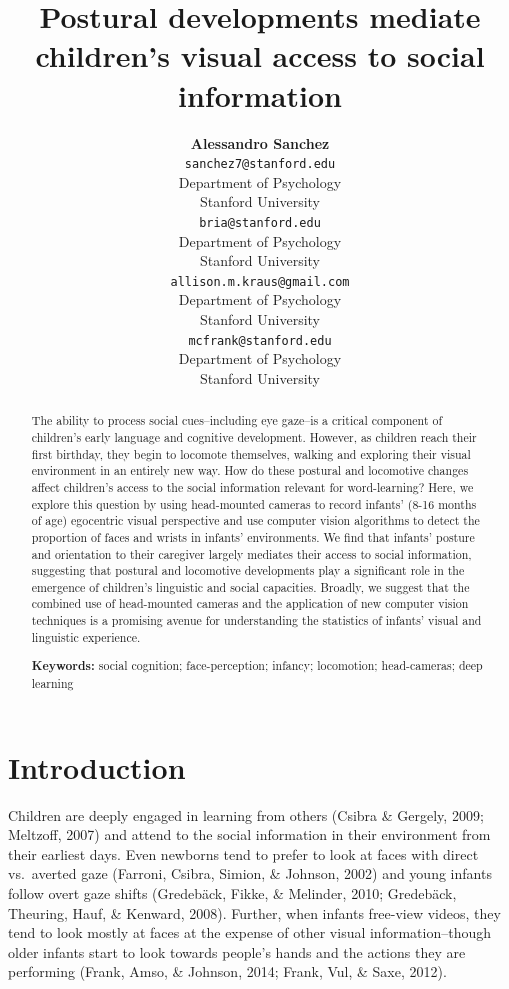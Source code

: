 \documentclass[10pt, letterpaper]{article}
\title{Postural developments mediate children's visual access to social
information}
\author{{\large \bf Alessandro Sanchez} \\ \texttt{sanchez7@stanford.edu} \\ Department of Psychology \\ Stanford University \And {\large \bf Bria Long} \\ \texttt{bria@stanford.edu} \\ Department of Psychology \\ Stanford University \And {\large \bf Ally Kraus} \\ \texttt{allison.m.kraus@gmail.com} \\ Department of Psychology \\ Stanford University \And {\large \bf Michael C. Frank} \\ \texttt{mcfrank@stanford.edu} \\ Department of Psychology \\ Stanford University}
\begin{document}
\maketitle

\begin{abstract}
The ability to process social cues--including eye gaze--is a critical
component of children's early language and cognitive development.
However, as children reach their first birthday, they begin to locomote
themselves, walking and exploring their visual environment in an
entirely new way. How do these postural and locomotive changes affect
children's access to the social information relevant for word-learning?
Here, we explore this question by using head-mounted cameras to record
infants' (8-16 months of age) egocentric visual perspective and use
computer vision algorithms to detect the proportion of faces and wrists
in infants' environments. We find that infants' posture and orientation
to their caregiver largely mediates their access to social information,
suggesting that postural and locomotive developments play a significant
role in the emergence of children's linguistic and social capacities.
Broadly, we suggest that the combined use of head-mounted cameras and
the application of new computer vision techniques is a promising avenue
for understanding the statistics of infants' visual and linguistic
experience.

\textbf{Keywords:}
social cognition; face-perception; infancy; locomotion; head-cameras;
deep learning
\end{abstract}

\section{Introduction}\label{introduction}

Children are deeply engaged in learning from others (Csibra \& Gergely,
2009; Meltzoff, 2007) and attend to the social information in their
environment from their earliest days. Even newborns tend to prefer to
look at faces with direct vs.~averted gaze (Farroni, Csibra, Simion, \&
Johnson, 2002) and young infants follow overt gaze shifts (Gredebäck,
Fikke, \& Melinder, 2010; Gredebäck, Theuring, Hauf, \& Kenward, 2008).
Further, when infants free-view videos, they tend to look mostly at
faces at the expense of other visual information--though older infants
start to look towards people's hands and the actions they are performing
(Frank, Amso, \& Johnson, 2014; Frank, Vul, \& Saxe, 2012).
\end{document}
